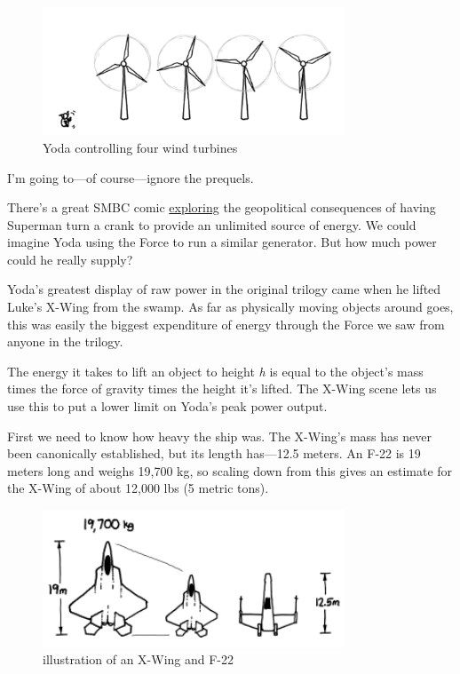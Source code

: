 \hfill{}

\begin{figure}[!htbp]
\centering
\includegraphics[scale=0.5, max width=0.8\textwidth]{imgs/a/3/01.png}
\caption{Yoda controlling four wind turbines}
\end{figure}

{I’m going to—of course—ignore the prequels.}

{There’s a great SMBC comic \href{http://www.smbc-comics.com/index.php?db=comics&id=2305\#comic}{exploring} the geopolitical consequences of having Superman turn a crank to provide an unlimited source of energy. We could imagine Yoda using the Force to run a similar generator. But how much power could he really supply?}

{Yoda’s greatest display of raw power in the original trilogy came when he lifted Luke’s X-Wing from the swamp. As far as physically moving objects around goes, this was easily the biggest expenditure of energy through the Force we saw from anyone in the trilogy.}

{The energy it takes to lift an object to height \emph{h} is equal to the object’s mass times the force of gravity times the height it’s lifted. The X-Wing scene lets us use this to put a lower limit on Yoda's peak power output.}

{First we need to know how heavy the ship was. The X-Wing’s mass has never been canonically established, but its length has—12.5 meters. An F-22 is 19 meters long and weighs 19,700 kg, so scaling down from this gives an estimate for the X-Wing of about 12,000 lbs (5 metric tons).}

\begin{figure}[!htbp]
\centering
\includegraphics[scale=0.5, max width=0.8\textwidth]{imgs/a/3/02.png}
\caption{illustration of an X-Wing and F-22}
\end{figure}

